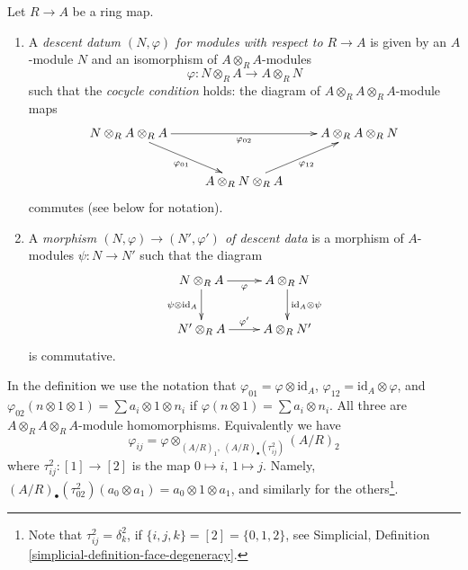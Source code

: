 \begin{definition}
\label{definition-descent-datum-modules}
Let $R \to A$ be a ring map.
\begin{enumerate}
\item A {\it descent datum $(N, \varphi)$ for modules
with respect to $R \to A$}
is given by an $A$-module $N$ and an isomorphism of
$A \otimes_R A$-modules
$$
\varphi : N \otimes_R A \to A \otimes_R N
$$
such that the {\it cocycle condition} holds: the diagram
of $A \otimes_R A \otimes_R A$-module maps
$$
\xymatrix{
N \otimes_R A \otimes_R A \ar[rr]_{\varphi_{02}}
\ar[rd]_{\varphi_{01}}
& &
A \otimes_R A \otimes_R N \\
& A \otimes_R N \otimes_R A \ar[ru]_{\varphi_{12}} &
}
$$
commutes (see below for notation).
\item A {\it morphism $(N, \varphi) \to (N', \varphi')$ of descent data}
is a morphism of $A$-modules $\psi : N \to N'$ such that
the diagram
$$
\xymatrix{
N \otimes_R A \ar[r]_\varphi \ar[d]_{\psi \otimes \text{id}_A} &
A \otimes_R N \ar[d]^{\text{id}_A \otimes \psi} \\
N' \otimes_R A \ar[r]^{\varphi'} &
A \otimes_R N'
}
$$
is commutative.
\end{enumerate}
\end{definition}

\noindent
In the definition we use the notation that
$\varphi_{01} = \varphi \otimes \text{id}_A$,
$\varphi_{12} = \text{id}_A \otimes \varphi$, and
$\varphi_{02}(n \otimes 1 \otimes 1) = \sum a_i \otimes 1 \otimes n_i$
if $\varphi(n \otimes 1) = \sum a_i \otimes n_i$. All three are
$A \otimes_R A \otimes_R A$-module homomorphisms. Equivalently we have
$$
\varphi_{ij}
=
\varphi \otimes_{(A/R)_1, \ (A/R)_\bullet(\tau^2_{ij})} (A/R)_2
$$
where $\tau^2_{ij} : [1] \to [2]$ is the map
$0 \mapsto i$, $1 \mapsto j$. Namely,
$(A/R)_{\bullet}(\tau^2_{02})(a_0 \otimes a_1) =
a_0 \otimes 1 \otimes a_1$,
and similarly for the others\footnote{Note that
$\tau^2_{ij} = \delta^2_k$, if $\{i, j, k\} = [2] = \{0, 1, 2\}$,
see Simplicial, Definition \ref{simplicial-definition-face-degeneracy}.}.

